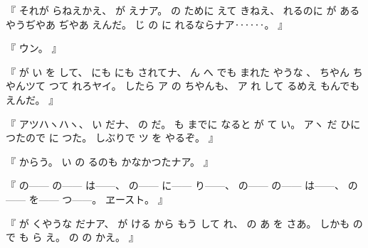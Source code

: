 %
『
それが
らねえかえ、
%
が
えナア。
%
の
ために
えて%
きねえ、
%
れるのに
が
あるやうぢやあ
ぢやあ
えんだ。
%
じ
の
に
れるならナア‥‥‥。
』

%
『
ウン。
』

%
『
が
い
を
して、
%
にも
にも
されてナ、
%
ん
へ
でも
まれた
やうな
、
%
ちやん
ちやんツて
つて
れろヤイ。
%
したら
ア
の
ちやんも、
%
ア
れ
して
るめえ
もんでも
えんだ。
』

%
『
アツハヽハヽ、
%
い
だナ、
%
の
だ。
%
も
までに
なると
が
て
い。
%
アヽ
だ
ひに
つたので
に
つた。%
%
しぶりで
ツ
を
やるぞ。
』

%
『
からう。
%
い
の
るのも
かなかつたナア。
』

%
『
の{---}{---}%
の{---}{---}%
は{---}{---}、
%
の{---}{---}%
に{---}{---}%
り{---}{---}、
%
の{---}{---}%
の{---}{---}%
は{---}{---}、
%
の{---}{---}%
を{---}{---}%
つ{---}{---}。
%
ヱースト。
』

%
『
が
くやうな
だナア、
%
が
ける
から
もう
して%
れ、
%
の%
あ
を
さあ。
%
しかも
の
で
も
ら
え。
%
の
の
かえ。
』

